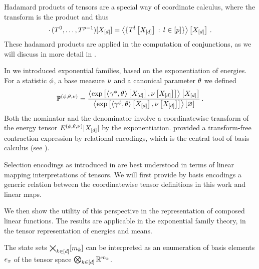 \begin{example}
    Hadamard products of tensors are a special way of coordinate calculus, where the transform is the product and thus
    \[ \cdot \, (T^{0},\ldots,T^{p-1})[X_{[d]}]
    = \left\langle \{T^{l}\left[X_{[d]}\right] \, : \, l\in[p] \}\right\rangle \left[ X_{[d]} \right] \, . \]
    These hadamard products are applied in the computation of conjunctions, as we will discuss in more detail in .
\end{example}

\begin{example}
    In  we introduced exponential families, based on the exponentiation of energies.
    For a statistic $\phi$, a base measure $\nu$ and a canonical parameter $\theta$ we defined
    \begin{align*}
        \mathbb{P}^{(\phi,\theta,\nu)} = \frac{
            \left\langle \mathrm{exp}\left[\left\langle \gamma^{\phi},\theta\right\rangle \left[ X_{[d]} \right],\nu\left[X_{[d]}\right]\right]\right\rangle \left[ X_{[d]} \right]
        }{
            \left\langle \mathrm{exp}\left[\left\langle \gamma^{\phi},\theta\right\rangle \left[ X_{[d]} \right],\nu\left[X_{[d]}\right]\right]\right\rangle \left[ \varnothing \right]
        } \, .
    \end{align*}
    Both the nominator and the denominator involve a coordinatewise transform of the energy tensor $E^{(\phi,\theta,\nu)}[X_{[d]}]$ by the exponentiation.
     provided a transform-free contraction expression by relational encodings, which is the central tool of basis calculus (see ).
\end{example}




Selection encodings as introduced in  are best understood in terms of linear mapping interpretations of tensors.
We will first provide by basis encodings a generic relation between the coordinatewise tensor definitions in this work and linear maps.

We then show the utility of this perspective in the representation of composed linear functions.
The results are applicable in the exponential family theory, in the tensor representation of energies and means.


The state sets $\bigtimes_{k\in[d]}[m_{k}]$ can be interpreted as an enumeration of basis elements $e_{x}$ of the tensor space $\bigotimes_{k\in[d]} \mathbb{R}^{m_{k}}$.

